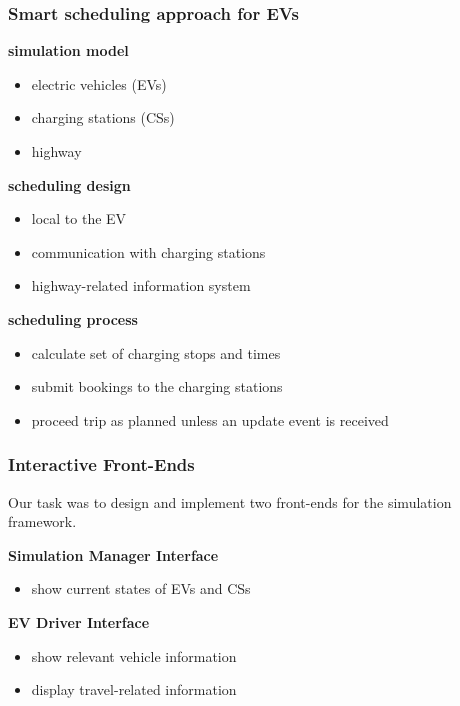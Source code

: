 \begin{frame}
\frametitle{Smart scheduling approach for EVs}

\begin{PraesentationAufzaehlung}
    \item \textbf{simulation model}
        \begin{itemize}
        \item electric vehicles (EVs)
        \item charging stations (CSs)
        \item highway
        \end{itemize}

    \item \textbf{scheduling design}
        \begin{itemize}
        \item local to the EV
        \item communication with charging stations
        \item highway-related information system
        \end{itemize}

    \item \textbf{scheduling process}
        \begin{itemize}
        \item calculate set of charging stops and times
        \item submit bookings to the charging stations
        \item proceed trip as planned unless an update event is received
        \end{itemize}

\end{PraesentationAufzaehlung}

\end{frame}
\clearpage



\begin{frame}
\frametitle{Interactive Front-Ends}

Our task was to design and implement two front-ends for the simulation framework.

\begin{PraesentationAufzaehlung}

    \item \textbf{Simulation Manager Interface}
        \begin{itemize}
        \item show current states of EVs and CSs
        \end{itemize}

    \item \textbf{EV Driver Interface}
        \begin{itemize}
        \item show relevant vehicle information
        \item display travel-related information
        \end{itemize}

\end{PraesentationAufzaehlung}

\end{frame}
\clearpage



